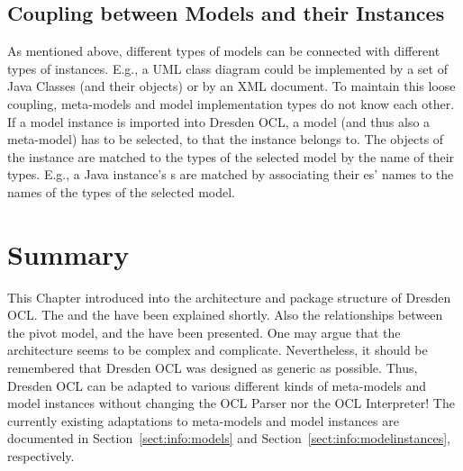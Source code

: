 \subsection{Coupling between Models and their Instances}

As mentioned above, different types of models can be connected with different 
types of instances. E.g., a \acs{UML} class diagram could be implemented by a 
set of Java Classes (and their objects) or by an \acs{XML} document. To 
maintain this loose coupling, meta-models and model implementation types do not 
know each other. If a model instance is imported into Dresden OCL, a model (and
thus also a meta-model) has to be selected, to that the instance belongs to. The
objects of the instance are matched to the types of the selected model by the 
name of their types. E.g., a Java instance's s are matched by
associating their es' names to the names of the types of the
selected model.



\section{Summary}

This Chapter introduced into the architecture and package structure of
Dresden OCL. The  and the  
have been explained shortly. Also the relationships between the pivot model, 
 and the  have
been presented. One may argue that the architecture seems to be complex and 
complicate. Nevertheless, it should be remembered that Dresden OCL was 
designed as generic as possible. Thus, Dresden OCL can be adapted to various
different kinds of meta-models and model instances without changing the
\acs{OCL} Parser nor the \acs{OCL} Interpreter! The currently existing
adaptations to meta-models and model instances are documented in
Section~\ref{sect:info:models} and Section~\ref{sect:info:modelinstances},
respectively.
